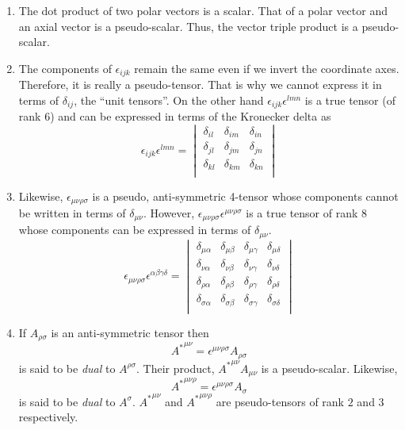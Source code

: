 \begin{enumerate}
\item The dot product of two polar vectors is a scalar. That of a polar vector
and an axial vector is a pseudo-scalar. Thus, the vector triple product is a
pseudo-scalar.

\item The components of $\epsilon_{ijk}$ remain the same even if 
we invert the coordinate axes. Therefore, it is really a pseudo-tensor. That 
is why we cannot express it in terms of $\delta_{ij}$, the ``unit 
tensors''. On the other hand $\epsilon_{ijk}\epsilon^{lmn}$ 
is a true tensor (of rank $6$) and can be expressed in terms of the Kronecker 
delta as
\begin{equation}\label{c1e60}
\epsilon_{ijk}\epsilon^{lmn} = \begin{vmatrix}
\delta_{il} & \delta_{im} & \delta_{in} \\
\delta_{jl} & \delta_{jm} & \delta_{jn} \\
\delta_{kl} & \delta_{km} & \delta_{kn} \\
\end{vmatrix}
\end{equation}

\item Likewise, $\epsilon_{\mu\nu\rho\sigma}$ is a pseudo, anti-symmetric
4-tensor whose components cannot be written in terms of $\delta_{\mu\nu}$. 
However, $\epsilon_{\mu\nu\rho\sigma}\epsilon^{\mu\nu\rho\sigma}$ is a true 
tensor of rank $8$ whose components can be expressed in terms of 
$\delta_{\mu\nu}$.
\begin{equation}\label{c1e61}
\epsilon_{\mu\nu\rho\sigma}\epsilon^{\alpha\beta\gamma\delta} = 
\begin{vmatrix}
\delta_{\mu\alpha} & \delta_{\mu\beta} & \delta_{\mu\gamma} & 
\delta_{\mu\delta} \\
\delta_{\nu\alpha} & \delta_{\nu\beta} & \delta_{\nu\gamma} & 
\delta_{\nu\delta} \\
\delta_{\rho\alpha} & \delta_{\rho\beta} & \delta_{\rho\gamma} &
\delta_{\rho\delta} \\
\delta_{\sigma\alpha} & \delta_{\sigma\beta} & \delta_{\sigma\gamma} & 
\delta_{\sigma\delta} \\
\end{vmatrix}
\end{equation}

\item If $A_{\rho\sigma}$ is an anti-symmetric tensor then
\begin{equation}\label{c1e62}
{A^\ast}^{\mu\nu} = \epsilon^{\mu\nu\rho\sigma}A_{\rho\sigma}
\end{equation}
is said to be \emph{dual} to $A^{\rho\sigma}$. Their product, ${A^\ast}^{\mu\nu}
A_{\mu\nu}$ is a pseudo-scalar. Likewise, 
\begin{equation}\label{c1e63}
{A^\ast}^{\mu\nu\rho} = \epsilon^{\mu\nu\rho\sigma}A_{\sigma}
\end{equation}
is said to be \emph{dual} to $A^\sigma$. ${A^\ast}^{\mu\nu}$ and 
${A^\ast}^{\mu\nu\rho}$ are pseudo-tensors of rank $2$ and $3$ respectively.


\end{enumerate}
